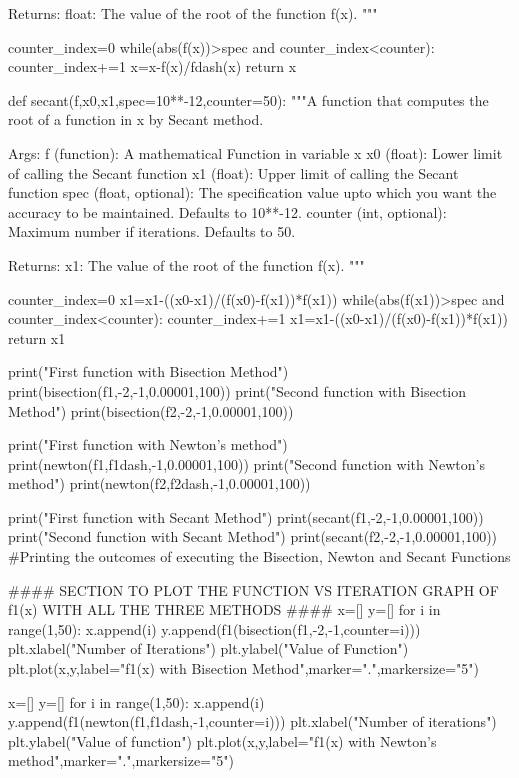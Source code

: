 \documentclass[12pt]{article}
\begin{document}
\begin{python}
    Returns:
        float: The value of the root of the function f(x).
    """

    counter_index=0
    while(abs(f(x))>spec and counter_index<counter):
        counter_index+=1
        x=x-f(x)/fdash(x)
    return x



def secant(f,x0,x1,spec=10**-12,counter=50):
    """A function that computes the root of a function in x by Secant method.

    Args:
        f (function):  A mathematical Function in variable x
        x0 (float): Lower limit of calling the Secant function
        x1 (float): Upper limit of calling the Secant function
        spec (float, optional): The specification value upto which you want the accuracy to be maintained. Defaults to 10**-12.
        counter (int, optional): Maximum number if iterations. Defaults to 50.

    Returns:
        x1: The value of the root of the function f(x).
    """

    counter_index=0
    x1=x1-((x0-x1)/(f(x0)-f(x1))*f(x1))
    while(abs(f(x1))>spec and counter_index<counter):
        counter_index+=1
        x1=x1-((x0-x1)/(f(x0)-f(x1))*f(x1))
    return x1



print("First function with Bisection Method")
print(bisection(f1,-2,-1,0.00001,100))
print("Second function with Bisection Method")
print(bisection(f2,-2,-1,0.00001,100))

print("First function with Newton's method")
print(newton(f1,f1dash,-1,0.00001,100))
print("Second function with Newton's method")
print(newton(f2,f2dash,-1,0.00001,100))

print("First function with Secant Method")
print(secant(f1,-2,-1,0.00001,100))
print("Second function with Secant Method")
print(secant(f2,-2,-1,0.00001,100))
#Printing the outcomes of executing the Bisection, Newton and Secant Functions


#### SECTION TO PLOT THE FUNCTION VS ITERATION GRAPH OF f1(x) WITH ALL THE THREE METHODS ####
x=[]
y=[]
for i in range(1,50):
    x.append(i)
    y.append(f1(bisection(f1,-2,-1,counter=i)))
plt.xlabel("Number of Iterations")
plt.ylabel("Value of Function")
plt.plot(x,y,label="f1(x) with Bisection Method",marker=".",markersize="5")


x=[]
y=[]
for i in range(1,50):
    x.append(i)
    y.append(f1(newton(f1,f1dash,-1,counter=i)))
plt.xlabel("Number of iterations")
plt.ylabel("Value of function")
plt.plot(x,y,label="f1(x) with Newton's method",marker=".",markersize="5")



\end{python}
\end{document}
